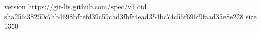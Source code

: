 version https://git-lfs.github.com/spec/v1
oid sha256:38250c7ab4698bfcefd39c59cad3fbfe4ead354bc74c56f696f9faad35e8e228
size 1350
